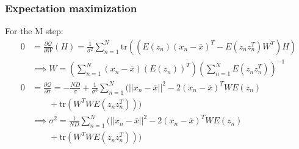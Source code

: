 \documentclass{beamer}
\begin{document}
\begin{frame}
    \frametitle{Expectation maximization}
    For the M step:
    \begin{align*}
        0&=\frac{\partial\mathcal{Q}}{\partial{}W}(H)=\frac{1}{\sigma^{2}}\sum_{n=1}^{N}\mathrm{tr}((E(z_{n})(x_{n}-\bar{x})^{T}-E(z_{n}z_{n}^{T})W^{T})H) \\
        &\implies{}W=(\sum_{n=1}^{N}(x_{n}-\bar{x})(E(z_{n}))^{T})(\sum_{n=1}^{N}E(z_{n}z_{n}^{T}))^{-1} \\
        0&=\frac{\partial\mathcal{Q}}{\partial\sigma}=-\frac{ND}{\sigma}+\frac{1}{\sigma^{3}}\sum_{n=1}^{N}(||x_{n}-\bar{x}||^{2}-2(x_{n}-\bar{x})^{T}WE(z_{n}) \\
        &\qquad+\mathrm{tr}(W^{T}WE(z_{n}z_{n}^{T}))) \\
        &\implies\sigma^{2}=\frac{1}{ND}\sum_{n=1}^{N}(||x_{n}-\bar{x}||^{2}-2(x_{n}-\bar{x})^{T}WE(z_{n}) \\
        &\qquad+\mathrm{tr}(W^{T}WE(z_{n}z_{n}^{T})))
    \end{align*}
\end{frame}
\end{document}
